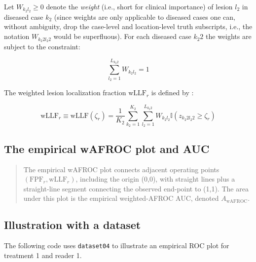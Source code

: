 \documentclass[
]{book}
\newenvironment{Shaded}{\begin{snugshade}}{\end{snugshade}}
\newcommand{\DataTypeTok}[1]{\textcolor[rgb]{0.13,0.29,0.53}{#1}}
\newcommand{\DecValTok}[1]{\textcolor[rgb]{0.00,0.00,0.81}{#1}}
\newcommand{\KeywordTok}[1]{\textcolor[rgb]{0.13,0.29,0.53}{\textbf{#1}}}
\newcommand{\NormalTok}[1]{#1}
\newcommand{\OperatorTok}[1]{\textcolor[rgb]{0.81,0.36,0.00}{\textbf{#1}}}
\newcommand{\StringTok}[1]{\textcolor[rgb]{0.31,0.60,0.02}{#1}}
\begin{document}
Let \(W_{k_2 l_2} \geq 0\) denote the \emph{weight} (i.e., short for clinical importance) of lesion \(l_2\) in diseased case \(k_2\) (since weights are only applicable to diseased cases one can, without ambiguity, drop the case-level and location-level truth subscripts, i.e., the notation \(W_{k_2 2 l_2 2}\) would be superfluous). For each diseased case \(k_2 2\) the weights are subject to the constraint:

\begin{equation}
\sum_{l_2 =1 }^{L_{k_2 2}} W_{k_2 l_2} = 1
\label{eq:empirical-weights-constraint}
\end{equation}

The weighted lesion localization fraction \(\text{wLLF}_r\) is defined by \citep{RN2484}:

\begin{equation}
\text{wLLF}_r \equiv \text{wLLF}\left ( \zeta_r \right ) = \frac{1}{K_2}\sum_{k_2=1}^{K_2}\sum_{l_2=1}^{L_{k_2 2}}W_{k_2 l_2} \mathbb{I}\left ( z_{k_2 2 l_2 2} \geq \zeta_r \right )
\label{eq:empirical-wLLFr}
\end{equation}

\hypertarget{empirical-definition-empirical-auc-wafroc}{%
\subsection{The empirical wAFROC plot and AUC}\label{empirical-definition-empirical-auc-wafroc}}

\begin{quote}
The empirical wAFROC plot connects adjacent operating points \(\left ( \text{FPF}_r, \text{wLLF}_r \right )\), including the origin (0,0), with straight lines plus a straight-line segment connecting the observed end-point to (1,1). The area under this plot is the empirical weighted-AFROC AUC, denoted \(A_{\text{wAFROC}}\).
\end{quote}

\hypertarget{empirical-wafroc-plot-illustration}{%
\subsection{Illustration with a dataset}\label{empirical-wafroc-plot-illustration}}

The following code uses \texttt{dataset04} to illustrate an empirical ROC plot for treatment 1 and reader 1.

\begin{Shaded}
\end{Shaded}
\end{document}
